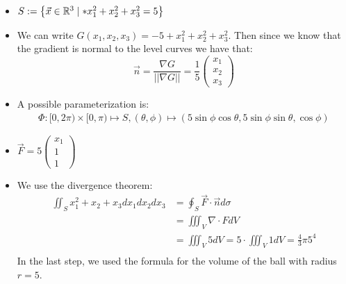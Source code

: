 \documentclass[11pt]{article}
\begin{document}
\begin{solution}     
    \begin{itemize}
     \item $S := \left\{ \vec x \in \bbR^3 \suchthat* x_1^2 + x_2^2 + x_3^2 = 5 \right\}$
     \item We can write $G(x_1,x_2,x_3) = -5 + x_1^2 + x_2^2 + x_3^2$. Then since we know that the gradient is normal to the level curves we have that:
    $$
    \vec{n} = \frac{\nabla G}{||\nabla G||} = \frac{1}{5}\begin{pmatrix}
    x_1\\x_2\\x_3
    \end{pmatrix}
    $$
     \item A possible parameterization is:
     \begin{align*}
        \Phi: [0,2\pi)\times[0,\pi) \mapsto S, (\theta,\phi) \mapsto (5\sin\phi\cos\theta, 5\sin\phi\sin\theta,\cos\phi)
     \end{align*}
     \item $\vec{F} = 5\begin{pmatrix}x_1\\1\\1\end{pmatrix}$
     \item 
     We use the divergence theorem:
     \begin{align*}
        \iint_{S} x_1^2 + x_2 + x_3 dx_1 dx_2 dx_3 & = \oint_{S} \vec{F}\cdot\vec{n} d\sigma \\
		& = \iiint_V \nabla \cdot F dV\\
		& = \iiint_V 5 dV = 5 \cdot \iiint_V 1 dV = \frac{4}{3}\pi5^4\\
     \end{align*}
     In the last step, we used the formula for the volume of the ball with radius $r=5$.
    \end{itemize}
\end{solution}
\end{document}
